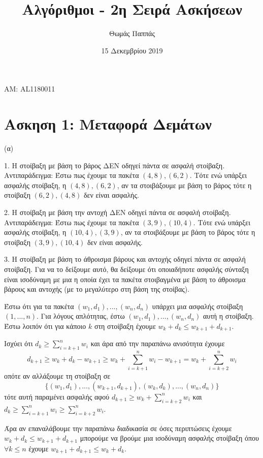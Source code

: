 \documentclass[a4paper,11pt]{article}
\begin{document}
\title{Αλγόριθμοι - 2η Σειρά Ασκήσεων}
\author{Θωμάς Παππάς}
\date{15 Δεκεμβρίου 2019}
\maketitle
\begin{center}ΑΜ: AL1180011\end{center}

\section*{Ασκηση 1: Μεταφορά Δεμάτων}
(α)

1. Η στοίβαξη με βάση το βάρος ΔΕΝ οδηγεί πάντα σε ασφαλή στοίβαξη.\\
Αντιπαράδειγμα: Έστω πως έχουμε τα πακέτα $(4, 8), (6, 2)$. Τότε ενώ υπάρξει ασφαλής στοίβαξη, η ${(4, 8), (6, 2)}$, αν τα στοιβάξουμε με βάση το βάρος τότε η στοίβαξη ${(6, 2) , (4, 8)}$ δεν είναι ασφαλής.

2. Η στοίβαξη με βάση την αντοχή ΔΕΝ οδηγεί πάντα σε ασφαλή στοίβαξη.\\
Αντιπαράδειγμα: Έστω πως έχουμε τα πακέτα $(3, 9), (10, 4)$. Τότε ενώ υπάρξει ασφαλής στοίβαξη, η ${(10, 4), (3, 9)}$, αν τα στοιβάξουμε με βάση το βάρος τότε η στοίβαξη ${(3, 9), (10, 4)}$ δεν είναι ασφαλής.

3. Η στοίβαξη με βάση το άθροισμα βάρους και αντοχής οδηγεί πάντα σε ασφαλή στοίβαξη. Για να το δείξουμε αυτό, θα δείξουμε ότι οποιαδήποτε ασφαλής σύνταξη είναι ισοδύναμη με μια η οποία έχει τα πακέτα στοιβαγμένα με βάση το άθροισμα βάρους και αντοχής (με το μεγαλύτερο στη βάση της στοίβας).

Έστω ότι για τα πακέτα $(w_1, d_1),...,(w_n, d_n)$ υπάρχει μια ασφαλής στοίβαξη $(1,...,n)$. Για λόγους απλότητας, έστω ${(w_1, d_1),..., (w_n, d_n)}$ αυτή η στοίβαξη. Έστω λοιπόν ότι για κάποιο $k$ στη στοίβαξη έχουμε $w_k + d_k \leq w_{k+1} + d_{k+1}$.

Ισχύει ότι $d_k \geq \sum_{i=k+1}^nw_i$ και άρα από την παραπάνω ανισότητα έχουμε
$$d_{k+1} \geq w_k + d_k - w_{k+1} \geq w_k + \sum_{i=k+1}^nw_i - w_{k+1} = w_k + \sum_{i=k+2}^nw_i$$
οπότε αν αλλάξουμε τη στοίβαξη σε
$$\{(w_1, d_1),...,(w_{k+1}, d_{k+1}), (w_k, d_k),...,(w_n, d_n)\}$$
τότε αυτή παραμένει ασφαλής αφού $d_{k+1} \geq w_k + \sum_{i=k+2}^nw_i$ και $d_k \geq \sum_{i=k+1}^nw_i \geq \sum_{i=k+2}^nw_i$.

Άρα αν επαναλάβουμε την παραπάνω διαδικασία σε όσες περιπτώσεις έχουμε $w_k + d_k \leq w_{k+1} + d_{k+1}$ μπορούμε να βρούμε μια ισοδύναμη ασφαλής στοίβαξη όπου $\forall k \leq n$ έχουμε $w_{k+1} + d_{k+1} \leq w_k + d_k$.
\end{document}
